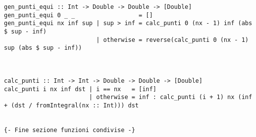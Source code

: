 \begin{verbatim}
gen_punti_equi :: Int -> Double -> Double -> [Double]
gen_punti_equi 0 _ _                  = []
gen_punti_equi nx inf sup | sup > inf = calc_punti 0 (nx - 1) inf (abs $ sup - inf) 
                          | otherwise = reverse(calc_punti 0 (nx - 1) sup (abs $ sup - inf))



calc_punti :: Int -> Int -> Double -> Double -> [Double]
calc_punti i nx inf dst | i == nx   = [inf]
                        | otherwise = inf : calc_punti (i + 1) nx (inf + (dst / fromIntegral(nx :: Int))) dst


{- Fine sezione funzioni condivise -}

\end{verbatim}
